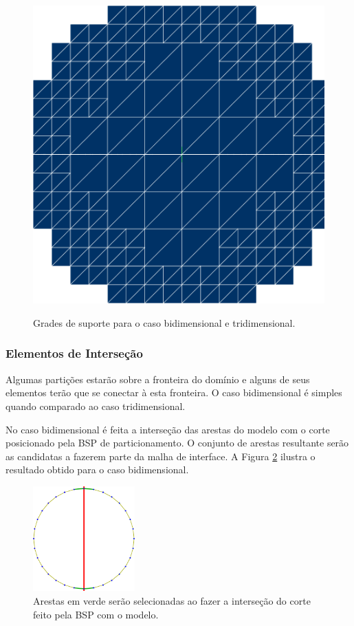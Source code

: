 \begin{figure}[!ht]
{     		\begin{minipage}[c]{0.4\textwidth}{\includegraphics[width=\textwidth]{fig/esfera3_grade.png}}\end{minipage}
     	}    
     	\caption{Grades de suporte para o caso bidimensional e tridimensional.}
     	\label{fig:grades_modelos}
     \end{figure}
     
        
\subsubsection{Elementos de Interseção}

Algumas partições estarão sobre a fronteira do domínio e alguns de seus elementos terão que se conectar à esta fronteira. O caso bidimensional é simples quando comparado ao caso tridimensional.

No caso bidimensional é feita a interseção das arestas do modelo com o corte posicionado pela BSP de particionamento. O conjunto de arestas resultante serão as candidatas a fazerem parte da malha de interface. A Figura \ref{fig:circulo_arestas} ilustra o resultado obtido para o caso bidimensional.


\begin{figure}[!ht]
	\centering
	\includegraphics[width=0.35\textwidth]{fig/circulo2_arestas.png}
	\caption{Arestas em verde serão selecionadas ao fazer a interseção do corte feito pela BSP com o modelo.}
	\label{fig:circulo_arestas}
\end{figure}


